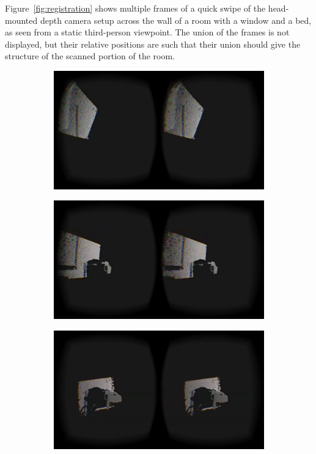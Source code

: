 \documentclass[pageno]{jpaper}
\begin{document}
Figure~\ref{fig:registration} shows multiple frames of a quick swipe of the
head-mounted depth camera setup across the wall of a room with a window and a
bed, as seen from a static third-person viewpoint. The union of the frames is
not displayed, but their relative positions are such that their union should
give the structure of the scanned portion of the room.

\begin{figure}
  \centering
  \begin{subfigure}[b]{0.3\textwidth}
    \includegraphics[width=\textwidth]{shot3.png}
    \label{fig:gull}
  \end{subfigure}%
  \qquad
  \begin{subfigure}[b]{0.3\textwidth}
    \includegraphics[width=\textwidth]{shot4.png}
    \label{fig:tiger}
  \end{subfigure}
  \qquad
  \begin{subfigure}[b]{0.3\textwidth}
    \includegraphics[width=\textwidth]{shot5.png}

\end{subfigure}
\end{figure}
\end{document}

